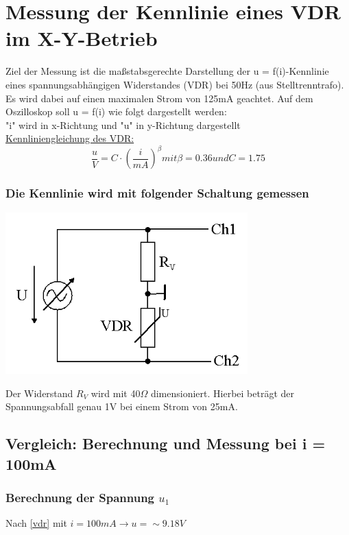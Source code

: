 \documentclass[11pt,a4paper,titlepage]{article}
\begin{document}
\section{Messung der Kennlinie eines VDR im X-Y-Betrieb}
Ziel der Messung ist die ma\ss{}stabsgerechte Darstellung der u = f(i)-Kennlinie eines spannungsabh\"angigen Widerstandes (VDR) bei 50Hz (aus Stelltrenntrafo). Es wird dabei auf einen maximalen Strom von 125mA geachtet. Auf dem Oszilloskop soll u = f(i) wie folgt dargestellt werden: \\[1ex] 
"i" wird in x-Richtung und "u" in y-Richtung dargestellt \\

\underline{Kennliniengleichung des VDR:} \\[1ex]
\begin{equation}\label{vdr}
\frac{u}{V}=C\cdot(\frac{i}{mA})^{\beta} mit \beta = 0.36 und C = 1.75 
\end{equation}
\subsubsection*{Die Kennlinie wird mit folgender Schaltung gemessen}
\begin{center}
\includegraphics[width=0.7\textwidth]{gep2v5_2}
\end{center}
Der Widerstand $R_V$ wird mit 40$\Omega$ dimensioniert. Hierbei betr\"agt der Spannungsabfall genau 1V bei einem Strom von 25mA.
\newpage
\subsection{Vergleich: Berechnung und Messung bei i = 100mA}
\subsubsection{Berechnung der Spannung $u_1$}
Nach \eqref{vdr} mit $i = 100mA \to u = \sim9.18V$
\end{document}
